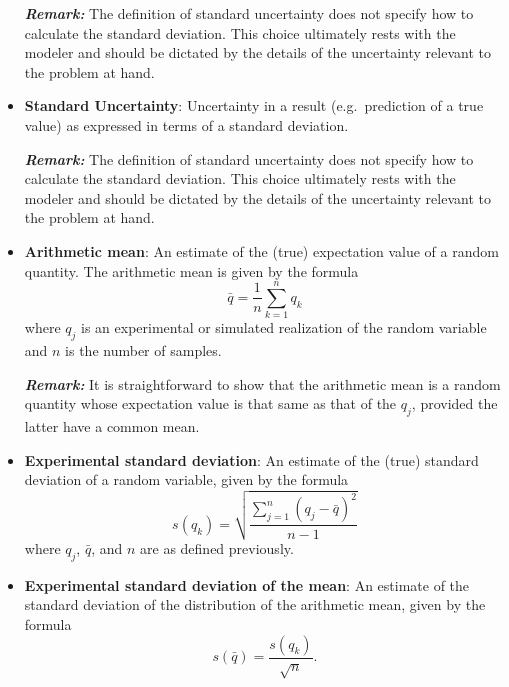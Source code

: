\begin{itemize}
\smallskip

\textbf{\textit{Remark:}} The definition of standard uncertainty does not specify how to calculate the standard deviation.
This choice ultimately rests with the modeler and should be dictated by the details of the uncertainty relevant to the problem at hand.  

\item {\bf Standard Uncertainty}: Uncertainty in a result (e.g.\ prediction of a true value) as expressed in terms of a standard deviation.
\smallskip 

\textbf{\textit{Remark:}} The definition of standard uncertainty does not specify how to calculate the standard deviation.
This choice ultimately rests with the modeler and should be dictated by the details of the uncertainty relevant to the problem at hand.  

\item {\bf Arithmetic mean}: An estimate of the (true) expectation value of a random quantity. The arithmetic mean is given by the formula
  \begin{equation}
    \bar{q} = \dfrac{1}{n} \sum_{k=1}^{n} q_k \label{def:arith_mean}
  \end{equation}
  where $q_j$ is an experimental or simulated realization of the random variable and $n$ is the number of samples. 
\smallskip 

\textbf{\textit{Remark:}} It is straightforward to show that the arithmetic mean is a random quantity whose expectation value is that same as that of the $q_j$, provided the latter have a common mean.

\item {\bf Experimental standard deviation}: An estimate of the (true) standard deviation of a random variable, given by the formula
  \begin{equation}
    s\left(q_k\right) = \sqrt{\dfrac{\sum_{j=1}^n\left(q_j - \bar{q}\right)^2}{n-1}} \label{def:exp_st_dev}
  \end{equation}
  where $q_j$, $\bar{q}$, and $n$ are as defined previously. 
  
\item {\bf Experimental standard deviation of the mean}: An estimate of the standard deviation of the distribution of the arithmetic mean, given by the formula
  \begin{equation}
    s\left(\bar{q}\right) = \dfrac{s\left(q_k\right)}{\sqrt{n}}. \label{def:exp_st_dev_mean}
  \end{equation}
  \smallskip
  

\end{itemize}
